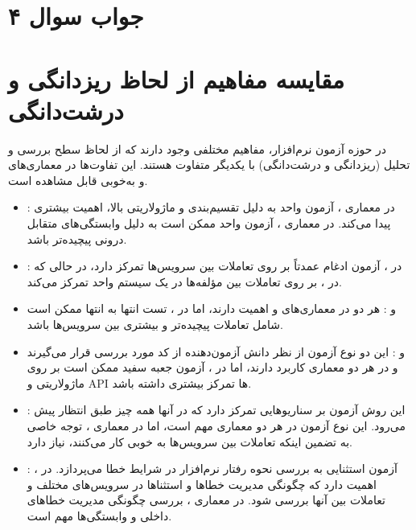\section*{جواب سوال ۴}

\section*{مقایسه مفاهیم از لحاظ ریزدانگی و درشت‌دانگی}

در حوزه آزمون نرم‌افزار، مفاهیم مختلفی وجود دارند که از لحاظ سطح بررسی و تحلیل (ریزدانگی و درشت‌دانگی) با یکدیگر متفاوت هستند. این تفاوت‌ها در معماری‌های 
و
به‌خوبی قابل مشاهده است.

\begin{itemize}
	\item {}: در معماری  ، آزمون واحد به دلیل تقسیم‌بندی و ماژولاریتی بالا، اهمیت بیشتری پیدا می‌کند. در معماری  ، آزمون واحد ممکن است به دلیل وابستگی‌های متقابل درونی پیچیده‌تر باشد.
	
	\item {}: در  ، آزمون ادغام عمدتاً بر روی تعاملات بین سرویس‌ها تمرکز دارد، در حالی که در  ، بر روی تعاملات بین مؤلفه‌ها در یک سیستم واحد تمرکز می‌کند.
	
	\item {} و : هر دو در معماری‌های  و  اهمیت دارند، اما در  ، تست انتها به انتها ممکن است شامل تعاملات پیچیده‌تر و بیشتری بین سرویس‌ها باشد.
	
	\item {} و  : این دو نوع آزمون از نظر دانش آزمون‌دهنده از کد مورد بررسی قرار می‌گیرند و در هر دو معماری کاربرد دارند، اما در 
 ، آزمون جعبه سفید ممکن است بر روی ماژولاریتی و API ها تمرکز بیشتری داشته باشد.
	
	\item {}: این روش آزمون بر سناریوهایی تمرکز دارد که در آنها همه چیز طبق انتظار پیش می‌رود. این نوع آزمون در هر دو معماری مهم است، اما در معماری 
	، توجه خاصی به تضمین اینکه تعاملات بین سرویس‌ها به خوبی کار می‌کنند، نیاز دارد.

	\item {}: آزمون استثنایی به بررسی نحوه رفتار نرم‌افزار در شرایط خطا می‌پردازد. در 
	، اهمیت دارد که چگونگی مدیریت خطاها و استثناها در سرویس‌های مختلف و تعاملات بین آنها بررسی شود. در معماری 
	، بررسی چگونگی مدیریت خطاهای داخلی و وابستگی‌ها مهم است.


\end{itemize}
